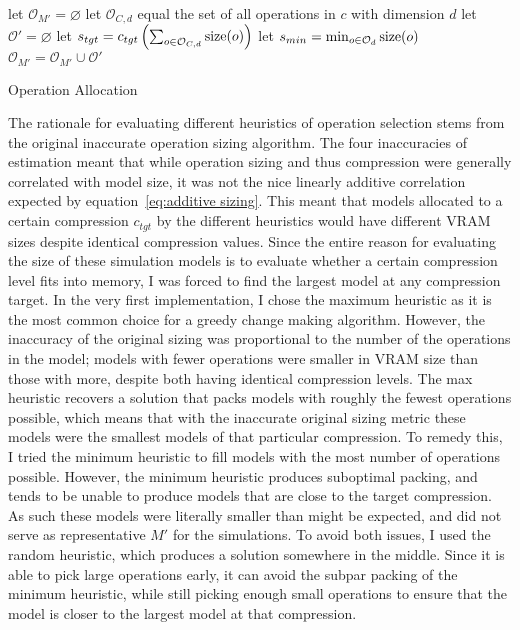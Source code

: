 \begin{algorithm}
	\SetAlgoLined
	let $\mathcal{O}_{M'} = \varnothing$\;
	 {
		 {
			let $\mathcal{O}_{C,d}$ equal the set of all operations in $c$ with dimension $d$\;
			let $\mathcal{O}' = \varnothing$ \;
			let $s_{tgt} = c_{tgt} \left( \sum_{o \in \mathcal{O}_{C,d}}{\text{size}(o)} \right) $\;
			 {
				let $s_{min} = \min_{o \in \mathcal{O}_d} \text{size}(o)$\;
			}
			$\mathcal{O}_{M'} = \mathcal{O}_{M'} \cup \mathcal{O}'$\;
		}
	}
	\caption{Operation Allocation}
	\label{alg:operation packing}
\end{algorithm}

The rationale for evaluating different heuristics of operation selection stems from the original inaccurate operation
sizing algorithm. The four inaccuracies of estimation meant that while operation sizing and thus compression were generally
correlated with model size, it was not the nice linearly additive correlation expected by equation~\ref{eq:additive sizing}.
This meant that models allocated to a certain compression $c_{tgt}$ by the different heuristics would have different VRAM sizes despite
identical compression values. Since the entire reason for evaluating the size of these simulation models is to evaluate
whether a certain compression level fits into memory, I was forced to find the largest model at any compression
target. In the very first implementation, I chose the maximum heuristic as it is the most common choice for a greedy
change making algorithm. However, the inaccuracy of the original sizing was proportional to the number of the operations
in the model; models with fewer operations were smaller in VRAM size than those with more, despite both having identical
compression levels. The max heuristic recovers a solution that packs models with roughly the fewest operations possible,
which means that with the inaccurate original sizing metric these models were the smallest models of that particular
compression. To remedy this, I tried the minimum heuristic to fill models with the most number of operations possible.
However, the minimum heuristic produces suboptimal packing, and tends to be unable to produce models that are close
to the target compression. As such these models were literally smaller than might be expected, and did not serve as
representative $M'$ for the simulations. To avoid both issues, I used the random heuristic, which produces a solution
somewhere in the middle. Since it is able to pick large operations early, it can avoid the subpar packing of the minimum
heuristic, while still picking enough small operations to ensure that the model is closer to the largest model at that
compression.

